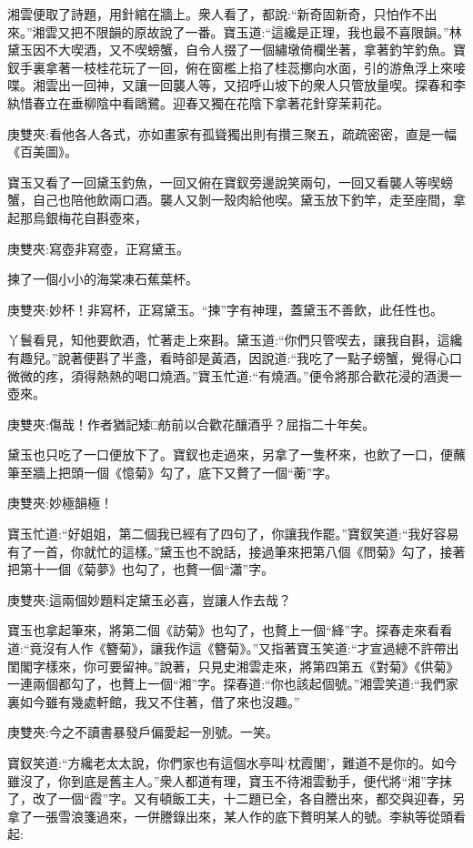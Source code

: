 \begin{parag}
    湘雲便取了詩題，用針綰在牆上。衆人看了，都說:“新奇固新奇，只怕作不出來。”湘雲又把不限韻的原故說了一番。寶玉道:“這纔是正理，我也最不喜限韻。”林黛玉因不大喫酒，又不喫螃蟹，自令人掇了一個繡墩倚欄坐著，拿著釣竿釣魚。寶釵手裏拿著一枝桂花玩了一回，俯在窗檻上掐了桂蕊擲向水面，引的游魚浮上來唼喋。湘雲出一回神，又讓一回襲人等，又招呼山坡下的衆人只管放量喫。探春和李紈惜春立在垂柳陰中看鷗鷺。迎春又獨在花陰下拿著花針穿茉莉花。\begin{note}庚雙夾:看他各人各式，亦如畫家有孤聳獨出則有攢三聚五，疏疏密密，直是一幅《百美圖》。\end{note}寶玉又看了一回黛玉釣魚，一回又俯在寶釵旁邊說笑兩句，一回又看襲人等喫螃蟹，自己也陪他飲兩口酒。襲人又剝一殼肉給他喫。黛玉放下釣竿，走至座間，拿起那烏銀梅花自斟壺來，\begin{note}庚雙夾:寫壺非寫壺，正寫黛玉。\end{note}揀了一個小小的海棠凍石蕉葉杯。\begin{note}庚雙夾:妙杯！非寫杯，正寫黛玉。“揀”字有神理，蓋黛玉不善飲，此任性也。\end{note}丫鬟看見，知他要飲酒，忙著走上來斟。黛玉道:“你們只管喫去，讓我自斟，這纔有趣兒。”說著便斟了半盞，看時卻是黃酒，因說道:“我吃了一點子螃蟹，覺得心口微微的疼，須得熱熱的喝口燒酒。”寶玉忙道:“有燒酒。”便令將那合歡花浸的酒燙一壺來。\begin{note}庚雙夾:傷哉！作者猶記矮□舫前以合歡花釀酒乎？屈指二十年矣。\end{note}黛玉也只吃了一口便放下了。寶釵也走過來，另拿了一隻杯來，也飲了一口，便蘸筆至牆上把頭一個《憶菊》勾了，底下又贅了一個“蘅”字。\begin{note}庚雙夾:妙極韻極！\end{note}寶玉忙道:“好姐姐，第二個我已經有了四句了，你讓我作罷。”寶釵笑道:“我好容易有了一首，你就忙的這樣。”黛玉也不說話，接過筆來把第八個《問菊》勾了，接著把第十一個《菊夢》也勾了，也贅一個“瀟”字。\begin{note}庚雙夾:這兩個妙題料定黛玉必喜，豈讓人作去哉？\end{note}寶玉也拿起筆來，將第二個《訪菊》也勾了，也贅上一個“絳”字。探春走來看看道:“竟沒有人作《簪菊》，讓我作這《簪菊》。”又指著寶玉笑道:“才宣過總不許帶出閨閣字樣來，你可要留神。”說著，只見史湘雲走來，將第四第五《對菊》《供菊》一連兩個都勾了，也贅上一個“湘”字。探春道:“你也該起個號。”湘雲笑道:“我們家裏如今雖有幾處軒館，我又不住著，借了來也沒趣。”\begin{note}庚雙夾:今之不讀書暴發戶偏愛起一別號。一笑。\end{note}寶釵笑道:“方纔老太太說，你們家也有這個水亭叫‘枕霞閣’，難道不是你的。如今雖沒了，你到底是舊主人。”衆人都道有理，寶玉不待湘雲動手，便代將“湘”字抹了，改了一個“霞”字。又有頓飯工夫，十二題已全，各自謄出來，都交與迎春，另拿了一張雪浪箋過來，一併謄錄出來，某人作的底下贅明某人的號。李紈等從頭看起:
\end{parag}


